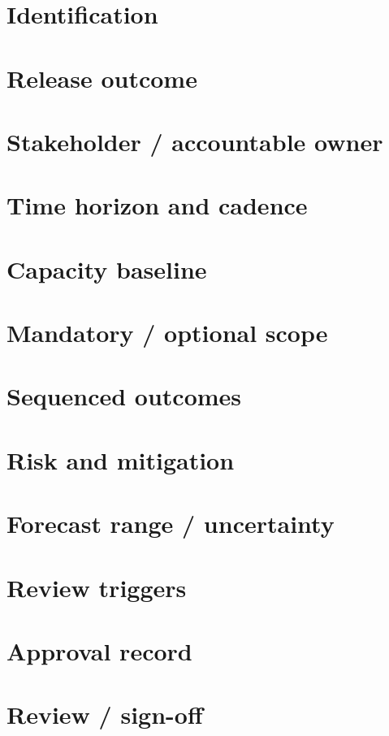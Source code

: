 \documentclass[11pt,letterpaper]{article}
\begin{document}
\section{Identification}
\section{Release outcome}
\section{Stakeholder / accountable owner}
\section{Time horizon and cadence}
\section{Capacity baseline}
\section{Mandatory / optional scope}
\clearpage
\section{Sequenced outcomes}
\section{Risk and mitigation}
\section{Forecast range / uncertainty}
\section{Review triggers}
\clearpage
\section{Approval record}
\section{Review / sign-off}
\end{document}
